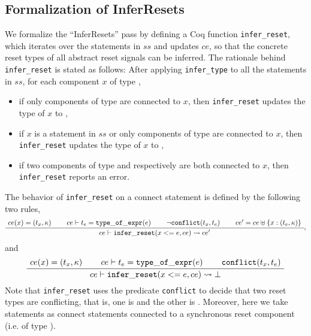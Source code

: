 \subsection{Formalization of InferResets}
We formalize the ``InferResets'' pass by defining a Coq function {\tt infer\_reset}, which iterates over the statements in $ss$ and updates $ce$, so that the concrete reset types of all abstract reset signals can be inferred. 
The rationale behind {\tt infer\_reset} is stated as follows: After applying {\tt infer\_type} to all the statements in $ss$, for each component $x$ of  type ,
\begin{itemize}
\item if only components of  type  are connected to $x$, then {\tt infer\_reset} updates the type of $x$ to , 
%
\item if $x$  is a statement in $ss$ or only components of type  are connected to $x$, then {\tt infer\_reset} updates the type of $x$ to , 
%
\item if two components of type   and  respectively are both connected to $x$, then  {\tt infer\_reset} reports an error.
\end{itemize}
The behavior of {\tt infer\_reset} on a connect statement is defined by the following two rules, 
  \begin{gather}
    \label{rule-infer-reset-pass}
    \inferiv[]
    {\seqq{ce \vdash {\tt infer\_reset} (x<=e, ce) \rightsquigarrow ce'}}
    {\seqq{ce(x)= (t_x, \kappa)}} {\seqq{ce\vdash t_e={\tt type\_of\_expr}(e)}}
    {\seqq{{\tt \neg conflict} (t_x, t_e)}}
    {\seqq{ce'= ce \uplus \{x : (t_e, \kappa)\}}},
    \end{gather}
and 
  \begin{gather}
    \inferiii[]
    {\seqq{ce \vdash {\tt infer\_reset} (x<=e, ce) \rightsquigarrow \bot}}
    {\seqq{ce(x) = (t_x, \kappa)}} {\seqq{ce\vdash t_e={\tt type\_of\_expr}(e)}}
    {\seqq{{\tt conflict} (t_x, t_e)}}
    \end{gather}
Note that {\tt infer\_reset} uses the predicate {\tt conflict} to decide that two reset types are conflicting, that is, one is   and the other is .
Moreover, here we take  statements as connect statements connected to a synchronous reset component (i.e. of type ).

